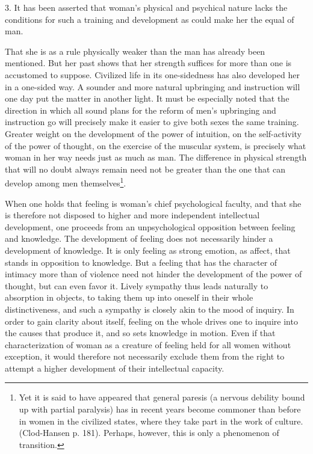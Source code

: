 \documentclass[12pt,a4paper,openany]{book}
\newcommand{\opage}[1]{\marginnote{\footnotesize\textit{[#1]}}}
\begin{document}
3. It has been asserted that woman's physical and psychical nature lacks the conditions for such a training and
development as could make her the equal of man.

That she is as a rule physically weaker than the man has already been mentioned. But her past shows that her strength
suffices for more than one is accustomed to suppose. Civilized
\opage{319}life in its one-sidedness has also developed her in a one-sided way. A sounder and more natural upbringing and
instruction will one day put the matter in another light. It must be especially noted that the direction in which all
sound plans for the reform of men's upbringing and instruction go will precisely make it easier to give both sexes the
same training. Greater weight on the development of the power of intuition, on the self-activity of the power of
thought, on the exercise of the muscular system, is precisely what woman in her way needs just as much as man. The
difference in physical strength that will no doubt always remain need not be greater than the one that can develop
among men themselves\footnote[1]{Yet it is said to have appeared that general paresis (a nervous debility bound up with
partial paralysis) has in recent years become commoner than before in women in the civilized states, where they take
part in the work of culture. (Clod-Hansen p. 181). Perhaps, however, this is only a phenomenon of transition.}.

When one holds that feeling is woman's chief psychological faculty, and that she is therefore not disposed to higher
and more independent intellectual development, one proceeds from an unpsychological opposition between feeling and
knowledge. The development of feeling does not necessarily hinder a development of knowledge. It is only feeling as
strong emotion, as affect, that stands in opposition to knowledge. But a feeling that has the character of intimacy more
than of violence need not hinder the development of the power of thought, but can even favor it. Lively sympathy thus
leads naturally to absorption in objects, to taking them up into oneself in their whole distinctiveness, and such a
sympathy is closely akin to the mood of inquiry. In order to gain clarity about itself, feeling on the whole drives one
to inquire into the causes that produce it, and so sets knowledge in motion. Even if that characterization of woman as
a creature of feeling held for all women without exception, it would therefore not necessarily exclude them from the
right to attempt a higher development of their intellectual capacity.
\end{document}
